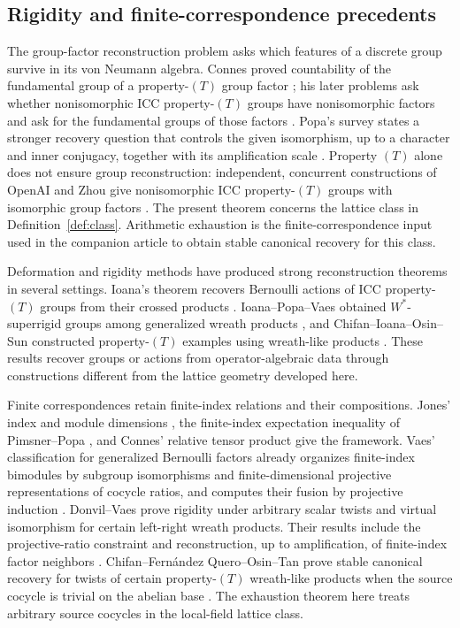 \subsection{Rigidity and finite-correspondence precedents}
The group-factor reconstruction problem asks which features of a
discrete group survive in its von Neumann algebra. Connes proved
countability of the fundamental group of a property-$(T)$ group factor
\cite{Connes1980}; his later problems ask whether nonisomorphic ICC
property-$(T)$ groups have nonisomorphic factors and ask for the
fundamental groups of those factors
\cite[Chapter~V, Appendix~B.$\varepsilon$, Problems~1--2]{Connes1994}.
Popa's survey states a stronger recovery question that controls the given
isomorphism, up to a character and inner conjugacy, together with its
amplification scale
\cite[Section~3, Equations~(3.2) and~(3.2$'$)]{Popa2007}.
Property $(T)$ alone does not ensure group reconstruction: independent,
concurrent constructions of OpenAI and Zhou give nonisomorphic ICC
property-$(T)$ groups with isomorphic group factors
\cite[Theorem~1.2]{OpenAI2026ConnesCounterexample}
\cite[Theorem~A]{Zhou2026Counterexamples}.
The present theorem concerns the lattice class in
Definition~\ref{def:class}. Arithmetic exhaustion is the
finite-correspondence input used in the companion article to obtain
stable canonical recovery for this class.

Deformation and rigidity methods have produced strong reconstruction
theorems in several settings. Ioana's theorem recovers Bernoulli
actions of ICC property-$(T)$ groups from their crossed products
\cite{Ioana2011}. Ioana--Popa--Vaes obtained $W^*$-superrigid groups
among generalized wreath products \cite{IPV2013}, and
Chifan--Ioana--Osin--Sun constructed property-$(T)$ examples using
wreath-like products \cite{CIOS2023}. These results recover groups or
actions from operator-algebraic data through constructions different
from the lattice geometry developed here.

Finite correspondences retain finite-index relations and their
compositions. Jones' index and module dimensions \cite{Jones1983},
the finite-index expectation inequality of Pimsner--Popa
\cite{PimsnerPopa1986}, and Connes' relative tensor product
\cite[Chapter~V, Appendix~B]{Connes1994} give the framework.
Vaes' classification for generalized Bernoulli factors already organizes
finite-index bimodules by subgroup isomorphisms and finite-dimensional
projective representations of cocycle ratios, and computes their fusion
by projective induction \cite[Theorem~2.2 and Section~6.2]{Vaes2008}.
Donvil--Vaes prove rigidity under arbitrary scalar twists and virtual
isomorphism for certain left-right wreath products. Their results
include the projective-ratio constraint and reconstruction, up to
amplification, of finite-index factor neighbors
\cite[Theorems~A and~6.6]{DonvilVaes2025}.
Chifan--Fern\'andez Quero--Osin--Tan prove stable canonical recovery
for twists of certain property-$(T)$ wreath-like products when the
source cocycle is trivial on the abelian base
\cite[Theorem~F]{CFOT2026}. The exhaustion theorem here treats arbitrary
source cocycles in the local-field lattice class.

